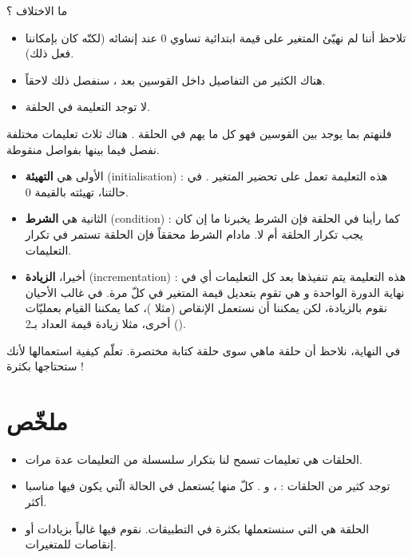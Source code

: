 ما الاختلاف ؟

\begin{itemize}
	\item تلاحظ أننا لم نهيّئ المتغير 
	على قيمة ابتدائية تساوي 0 عند إنشائه (لكنّه كان بإمكاننا فعل ذلك).
	\item هناك الكثير من التفاصيل داخل القوسين بعد 
	،
	سنفصل ذلك لاحقاً.
	\item لا توجد التعليمة 
	في الحلقة.
\end{itemize}

فلنهتم بما يوجد بين القوسين فهو كل ما يهم في الحلقة 
.
هناك ثلاث تعليمات مختلفة نفصل فيما بينها بفواصل منقوطة.

\begin{itemize}
	\item الأولى هي
	\textbf{التهيئة}
	(\textenglish{initialisation}) :
	هذه التعليمة تعمل على تحضير المتغير
	.
	في حالتنا، تهيئته بالقيمة 0.
	\item الثانية هي
	\textbf{الشرط}
	(\textenglish{condition}) :
	كما رأينا في الحلقة 
	فإن الشرط يخبرنا ما إن كان يجب تكرار الحلقة أم لا. مادام الشرط محققاً فإن الحلقة تستمر في تكرار التعليمات.
	\item أخيرا،
	\textbf{الزيادة}
	(\textenglish{incrementation}) :
	هذه التعليمة يتم تنفيذها بعد كل التعليمات أي في نهاية الدورة الواحدة و هي تقوم بتعديل قيمة المتغير 
	في كلّ مرة. في غالب الأحيان نقوم بالزيادة، لكن يمكننا أن نستعمل الإنقاص (مثلا 
	)،
	كما يمكننا القيام بعمليّات أخرى، مثلا زيادة قيمة العداد بـ2
	().
\end{itemize}

في النهاية، نلاحظ أن حلقة
ماهي سوى حلقة كتابة مختصرة. تعلّم كيفية استعمالها لأنك ستحتاجها بكثرة !

\section*{ملخّص}

\begin{itemize}
	\item الحلقات هي تعليمات تسمح لنا بتكرار سلسسلة من التعليمات عدة مرات.
	\item توجد كثير من الحلقات :
	،
	و 
	.
	كلّ منها  يُستعمل في الحالة الّتي يكون فيها مناسبا أكثر.
	\item الحلقة
	هي التي سنستعملها بكثرة في التطبيقات. نقوم فيها غالباً بزيادات أو إنقاصات للمتغيرات.
\end{itemize}

